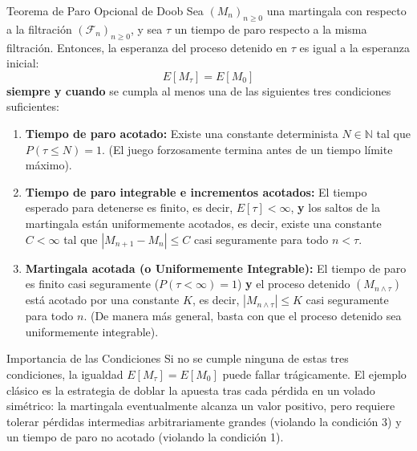 \documentclass[10pt,a4paper]{article}
\begin{document}
\begin{mytheo}{Teorema de Paro Opcional de Doob}{}
    Sea $(M_n)_{n \ge 0}$ una martingala con respecto a la filtración $(\mathcal{F}_n)_{n \ge 0}$, y sea $\tau$ un tiempo de paro respecto a la misma filtración. Entonces, la esperanza del proceso detenido en $\tau$ es igual a la esperanza inicial:
    \[ E[M_\tau] = E[M_0] \]
    \textbf{siempre y cuando} se cumpla al menos una de las siguientes tres condiciones suficientes:
    
    \begin{enumerate}
        \item \textbf{Tiempo de paro acotado:} Existe una constante determinista $N \in \mathbb{N}$ tal que $P(\tau \le N) = 1$. (El juego forzosamente termina antes de un tiempo límite máximo).
        
        \item \textbf{Tiempo de paro integrable e incrementos acotados:} 
        El tiempo esperado para detenerse es finito, es decir, $E[\tau] < \infty$, \textbf{y} los saltos de la martingala están uniformemente acotados, es decir, existe una constante $C < \infty$ tal que $|M_{n+1} - M_n| \le C$ casi seguramente para todo $n < \tau$.
        
        \item \textbf{Martingala acotada (o Uniformemente Integrable):} 
        El tiempo de paro es finito casi seguramente ($P(\tau < \infty) = 1$) \textbf{y} el proceso detenido $(M_{n \wedge \tau})$ está acotado por una constante $K$, es decir, $|M_{n \wedge \tau}| \le K$ casi seguramente para todo $n$. (De manera más general, basta con que el proceso detenido sea uniformemente integrable).
    \end{enumerate}
\end{mytheo}

\vspace{3mm}

\begin{alerta}{Importancia de las Condiciones}
    Si no se cumple ninguna de estas tres condiciones, la igualdad $E[M_\tau] = E[M_0]$ puede fallar trágicamente. El ejemplo clásico es la estrategia de doblar la apuesta tras cada pérdida en un volado simétrico: la martingala eventualmente alcanza un valor positivo, pero requiere tolerar pérdidas intermedias arbitrariamente grandes (violando la condición 3) y un tiempo de paro no acotado (violando la condición 1).
\end{alerta}

\newpage
\end{document}
